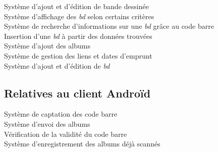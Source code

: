 \begin{description}

\item[Système d'ajout et d'édition de bande dessinée]

\item[Système d'affichage des \emph{bd} selon certains critères]

\item[Système de recherche d'informations sur une \emph{bd}  grâce au code barre]

\item[Insertion d'une \emph{bd} à partir des données trouvées] 

\item[Système d'ajout des albums]

\item[Système de gestion des liens et dates d'emprunt]

\item[Système d'ajout et d'édition de \emph{bd}]

\end{description}

\subsection{Relatives au client Androïd} 

\begin{description}

\item[Système de captation des code barre]

\item[Système d'envoi des albums]

\item[Vérification de la validité du code barre]

\item[Système d'enregistrement des albums déjà scannés]

\end{description}
